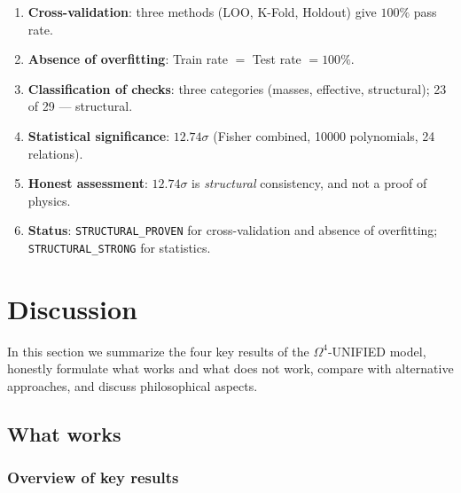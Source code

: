 \documentclass[11pt,a4paper]{article}
\newcommand{\Om}{\ensuremath{\Omega^4}}
\theoremstyle{definition}
\begin{document}
\begin{enumerate}
    \item \textbf{Cross-validation}: three methods (LOO, K-Fold,
          Holdout) give $100\%$ pass rate.
    \item \textbf{Absence of overfitting}: Train rate
          $=$ Test rate $= 100\%$.
    \item \textbf{Classification of checks}: three categories
          (masses, effective, structural); 23 of 29 ---
          structural.
    \item \textbf{Statistical significance}:
          $12.74\sigma$ (Fisher combined, 10000 polynomials,
          24 relations).
    \item \textbf{Honest assessment}: $12.74\sigma$ is
          \emph{structural} consistency, and not
          a proof of physics.
    \item \textbf{Status}: \texttt{STRUCTURAL\_PROVEN} for
          cross-validation and absence of overfitting;
          \texttt{STRUCTURAL\_STRONG} for statistics.
\end{enumerate}

\section{Discussion}
\label{sec:discussion}

In this section we summarize the four key results
of the $\Om$-UNIFIED model, honestly formulate what works and what
does not work, compare with alternative approaches, and discuss
philosophical aspects.

\subsection{What works}
\label{subsec:disc-works}

\subsubsection{Overview of key results}
\end{document}
